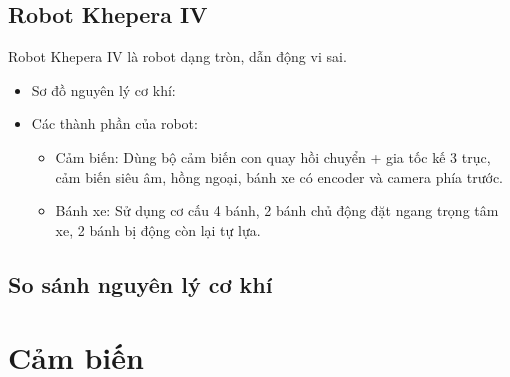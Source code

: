     \subsection{Robot Khepera IV}
    \hspace*{0.6cm} Robot Khepera IV là robot dạng tròn, dẫn động vi sai.
    \begin{itemize}
        \item Sơ đồ nguyên lý cơ khí:
        \item Các thành phần của robot:
            \begin{itemize}[label=\textendash]
                \item Cảm biến: Dùng bộ cảm biến con quay hồi chuyển + gia tốc kế 3 trục, cảm biến siêu âm, hồng ngoại, bánh xe có encoder và camera phía trước.
                \item Bánh xe: Sử dụng cơ cấu 4 bánh, 2 bánh chủ động đặt ngang trọng tâm xe, 2 bánh bị động còn lại tự lựa.
            \end{itemize}
    \end{itemize}


    \subsection{So sánh nguyên lý cơ khí}





    \section{Cảm biến}
